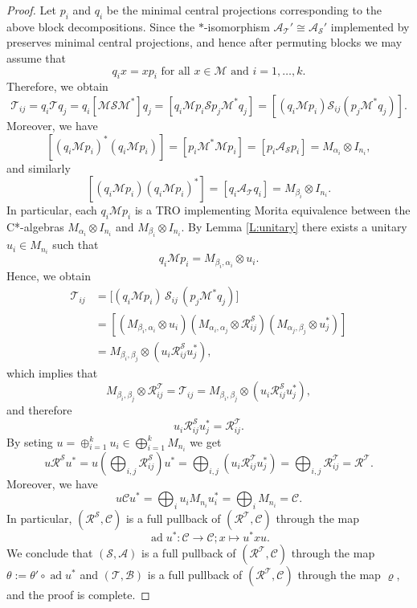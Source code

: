 \documentclass[11pt]{amsart}
\numberwithin{equation}{section}
\theoremstyle{plain}
\theoremstyle{definition}
\theoremstyle{remark}
\newcommand{\A}{{\mathcal{A}}}
\newcommand{\B}{{\mathcal{B}}}
\newcommand{\C}{{\mathcal{C}}}
\newcommand{\M}{{\mathcal{M}}}
\newcommand{\R}{{\mathcal{R}}}
\renewcommand{\S}{{\mathcal{S}}}
\newcommand{\T}{{\mathcal{T}}}
\newcommand{\foral}{\text{ for all }}
\newcommand{\ad}{\operatorname{ad}}
\begin{document}
\begin{proof}
Let $p_i$ and $q_i$ be the minimal central projections corresponding to the above block decompositions. Since the $*$-isomorphism $\A_{\T}'\cong \A_{\S}'$
implemented by \cite[Theorem 3.2]{Ele12} preserves minimal central projections, and hence after permuting blocks we may assume that
\[
q_i x= x p_i \foral x\in \M \text{ and } i=1,\dots,k.    
\]
Therefore, we obtain
\[
\T_{ij}=q_i \T q_j=q_i[\M\S\M^*]q_j
= 
[q_i \M p_i \S p_j\M^* q_j] = [(q_i \M p_i) \S_{ij}(p_j\M^* q_j)].
\]
Moreover, we have
\[
[(q_i\M p_i)^*(q_i\M p_i)]
=[p_i\M^*\M p_i]
=[p_i\A_{\S}p_i]
=M_{\alpha_i}\otimes I_{n_i},
\]
and similarly
\[
[(q_i\M p_i)(q_i\M p_i)^*]
=
[q_i \A_\T q_i]
=
M_{\beta_i}\otimes I_{n_i}.
\]
In particular, each $q_i\M p_i$ is a  TRO implementing Morita equivalence between the C*-algebras
$M_{\alpha_i} \otimes I_{n_i}$ and $M_{\beta_i}\otimes I_{n_i}$. By Lemma \ref{L:unitary} there exists a unitary $u_i \in M_{n_i}$ such that
\[
q_i\M p_i
=
M_{\beta_i,\alpha_i}\otimes u_i.
\]
Hence, we obtain
\begin{align*}
\T_{ij}&= 
\big[(q_i\M p_i)\,\S_{ij}\,(p_j\M^*q_j)\big]\\
&= [(M_{\beta_i,\alpha_i}\otimes u_{i})(M_{\alpha_i,\alpha_j} \otimes \R_{ij}^{\S})(M_{\alpha_j,\beta_j}\otimes u_{j}^*) ]\\
&=M_{\beta_i,\beta_j} \otimes (u_i\R_{ij}^{\S}u_j^*), 
\end{align*}
which implies that
\[
M_{\beta_i,\beta_j}\otimes\R_{ij}^{\T}=\T_{ij}
=M_{\beta_i,\beta_j}\otimes (u_i\R_{ij}^{\S}u_j^*),
\]
and therefore
\[u_i\R_{ij}^{\S}u_j^*
=\R_{ij}^{\T}.
\]
By seting $u= \oplus_{i=1}^k u_i\in \bigoplus_{i=1}^k M_{n_i}$ we get
\[
u\R^{\S}u^*=u(\bigoplus_{i,j}\R_{ij}^{\S})u^*= \bigoplus_{i,j} (u_i\R_{ij}^{\T}u_j^*)
=\bigoplus_{i,j}\R^{\T}_{ij}= \R^{\T}.
\] 
Moreover, we have 
\[
u \C u^*= \bigoplus_i u_i M_{n_i} u_i^*= \bigoplus_i  M_{n_i}= \C.
\]
In particular, $(\R^{\S},\C)$ is a full pullback of $(\R^{\T},\C)$ through the map
\[
\ad{u^*} \colon \C \to \C ; x\mapsto u^*xu.
\]
We conclude that  $(\S,\A)$ is a full pullback of $(\R^{\T},\C)$ through the map $\theta:=\theta'\circ\ad{u^*}$ and $(\T,\B)$ is a full pullback of $(\R^{\T},\C)$ through the map $\varrho$, and the proof is complete.
\end{proof}
\end{document}
